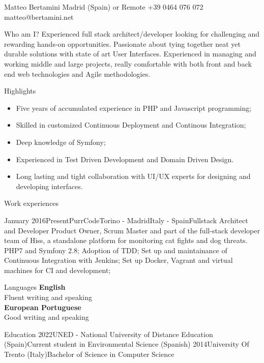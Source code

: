 \documentclass{bertuzcv}
\author{Matteo Bertamini}
\begin{document}
  \header
    {Matteo}
    {Bertamini}
    {Madrid (Spain) or Remote}
    {+39 0464 076 072}
    {matteo@bertamini.net}

  \noindent
  \begin{cvbox}{Who am I?}
     Experienced full stack architect/developer looking for challenging and
    rewarding hands-on opportunities. Passionate about tying together
    neat yet durable solutions with state of art User Interfaces. Experienced
    in managing and working middle and large projects, really comfortable with
    both front and back end web technologies and Agile methodologies.
  \end{cvbox}

  \begin{cvbox}{Highlights}
    \begin{itemize}[leftmargin=*,itemsep=-5pt]
        \item Five years of accumulated experience in PHP and Javascript programming;
        \item Skilled in customized Continuous Deployment and Continous Integration;
        \item Deep knowledge of Symfony;
        \item Experienced in Test Driven Development and Domain Driven Design.
        \item Long lasting and tight collaboration with UI/UX experts for designing and developing interfaces.
    \end{itemize}
  \end{cvbox}

  \noindent
  \begin{cvbox}{Work experiences}
    \begin{workExp}{January 2016}{Present}{PurrCode}{Torino - Madrid}{Italy - Spain}{Fullstack Architect and Developer}
      {Product Owner, Scrum Master and part of the full-stack developer team of Hiss, a standalone platform for monitoring cat fights and dog threats.}
      \workDetails
      {PHP7 and Symfony 2.8;}
      {Adoption of TDD;}
      {Set up and maintainance of Continuous Integration with Jenkins;}
      {Set up Docker, Vagrant and virtual machines for CI and development;}
    \end{workExp}
  \end{cvbox}

  \begin{cvbox}{Languages}
      {%
      \textbf{English}\\
      Fluent writing and speaking
      \\

      \textbf{European Portuguese}\\
      Good writing and speaking}
  \end{cvbox}

  \begin{cvbox}{Education}
    \eduItm
      {2022}{UNED - National University of Distance Education (Spain)}{Current student in Environmental Science (Spanish)}
      {2014}{University Of Trento (Italy)}{Bachelor of Science in Computer Science}
  \end{cvbox}
\end{document}
